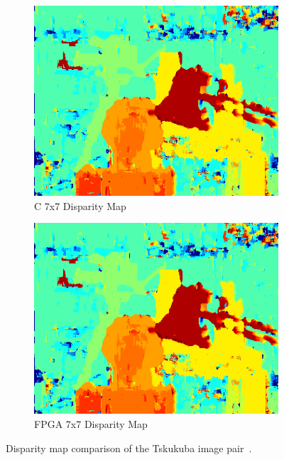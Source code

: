 \begin{figure}
\begin{center}
\begin{subfigure}{0.45\textwidth}
		\includegraphics[width=\textwidth]{figures/tsukuba_c_7x7.png}
		\caption{C 7x7 Disparity Map}
		\label{fig:tsukubaC7x7}
	\end{subfigure}
	\begin{subfigure}{0.45\textwidth}
		\includegraphics[width=\textwidth]{figures/tsukuba_buffer_7x7_2.png}
		\caption{FPGA 7x7 Disparity Map}
		\label{fig:tsukubaFPGA7x7}
	\end{subfigure}
	\captionfonts
	\caption{Disparity map comparison of the Tskukuba image pair~\cite{middlebury}.}
	\label{fig:tsukubaDispMap}
\end{center}
\end{figure}


